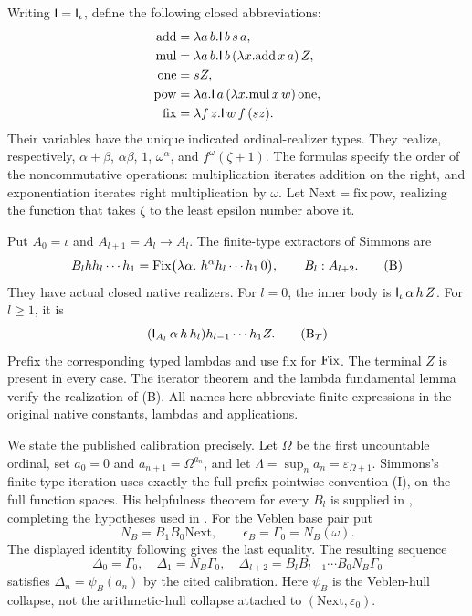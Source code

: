 Writing $\mathsf I=\mathsf I_\iota$, define the following closed abbreviations:
\[
\begin{aligned}
 \mathrm{add}&=\lambda a\,b.\mathsf I\,b\,s\,a,\\
 \mathrm{mul}&=\lambda a\,b.\mathsf I\,b\,(\lambda x.\mathrm{add}\,x\,a)\,Z,\\
 \mathrm{one}&=sZ,\\
 \mathrm{pow}&=\lambda a.\mathsf I\,a\,(\lambda x.\mathrm{mul}\,x\,w)\,\mathrm{one},\\
 \mathrm{fix}&=\lambda f\,z.\mathsf I\,w\,f\,(s z).
\end{aligned}
\]
Their variables have the unique indicated ordinal-realizer types.
They realize, respectively, $\alpha+\beta$, $\alpha\beta$,
$1$, $\omega^\alpha$, and $f^\omega(\zeta+1)$.
The formulas specify the order of the noncommutative operations:
multiplication iterates addition on the right, and exponentiation
iterates right multiplication by $\omega$.
Let $\mathrm{Next}=\mathrm{fix}\,\mathrm{pow}$, realizing the
function that takes $\zeta$ to the least epsilon number above it.

Put $A_0=\iota$ and $A_{l+1}=A_l\to A_l$. The finite-type
extractors of Simmons \cite[Defs.~2.10--2.14]{simmons2004}
are
\[
 B_l h h_l\cdots h_1
   =\operatorname{Fix}\bigl(\lambda\alpha.\ h^\alpha h_l\cdots h_1\,0\bigr),
 \qquad B_l:A_{l+2}.
 \tag{B}
\]
They have actual closed native realizers. For $l=0$, the inner body
is $\mathsf I_\iota\,\alpha\,h\,Z$. For $l\ge1$, it is
\[
 (\mathsf I_{A_l}\,\alpha\,h\,h_l)h_{l-1}\cdots h_1Z.
 \tag{B$_T$}
\]
Prefix the corresponding typed lambdas and use $\mathrm{fix}$ for
$\operatorname{Fix}$. The terminal $Z$ is present in every case. The iterator
theorem and the lambda fundamental lemma verify the realization
of (B). All names here abbreviate finite expressions in the original
native constants, lambdas and applications.

We state the published calibration precisely. Let $\Omega$ be the first
uncountable ordinal, set $a_0=0$ and $a_{n+1}=\Omega^{a_n}$, and let
$\Lambda=\sup_n a_n=\varepsilon_{\Omega+1}$.
Simmons's finite-type iteration uses exactly the full-prefix pointwise
convention (I), on the full function spaces. His helpfulness theorem
for every $B_l$ is supplied in
\cite[Theorem~5.10]{simmons2008}, completing the hypotheses used
in \cite[Theorem~6.1 and Corollary~6.2]{simmons2004}.
For the Veblen base pair put
\[
 N_B=B_1B_0\mathrm{Next},\qquad \epsilon_B=\Gamma_0=N_B(\omega).
\]
The displayed identity following
\cite[Lemma~6.6]{simmons2008} gives the last equality.
The resulting sequence
\[
 \Delta_0=\Gamma_0,\quad
 \Delta_1=N_B\Gamma_0,\quad
 \Delta_{l+2}=B_lB_{l-1}\cdots B_0N_B\Gamma_0
 \tag{D}
\]
satisfies $\Delta_n=\psi_B(a_n)$ by the cited calibration.
Here $\psi_B$ is the Veblen-hull collapse, not the arithmetic-hull
collapse attached to $(\mathrm{Next},\varepsilon_0)$.


